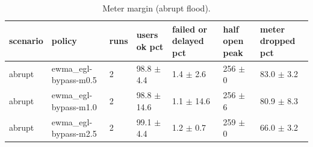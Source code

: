 \begin{table}[t]
\centering\small
\caption{Meter margin (abrupt flood).}\label{tab:margin}
\begin{tabular}{lllllll}
\toprule
scenario & policy & runs & users ok pct & failed or delayed pct & half open peak & meter dropped pct \\
\midrule
abrupt & ewma\_egl-bypass-m0.5 & 2 & 98.8 $\pm$ 4.4 & 1.4 $\pm$ 2.6 & 256 $\pm$ 0 & 83.0 $\pm$ 3.2 \\
abrupt & ewma\_egl-bypass-m1.0 & 2 & 98.8 $\pm$ 14.6 & 1.1 $\pm$ 14.6 & 256 $\pm$ 6 & 80.9 $\pm$ 8.3 \\
abrupt & ewma\_egl-bypass-m2.5 & 2 & 99.1 $\pm$ 4.4 & 1.2 $\pm$ 0.7 & 259 $\pm$ 0 & 66.0 $\pm$ 3.2 \\
\bottomrule
\end{tabular}
\end{table}
